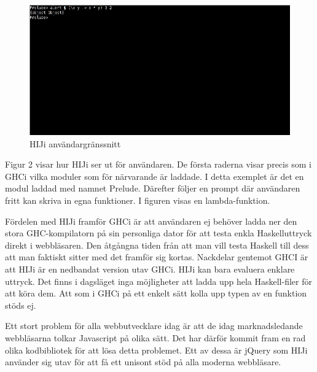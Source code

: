 \begin{figure}[H]
    \begin{center}
        \includegraphics[width=1\textwidth]{hiji_screen3.png}
        \caption{HIJi användargränssnitt}
    \end{center}
\end{figure}

Figur 2 visar hur HIJi ser ut för användaren. De första raderna visar precis som i GHCi vilka moduler som för närvarande är laddade. I detta exemplet är det en modul laddad med namnet Prelude. Därefter följer en prompt där användaren fritt kan skriva in egna funktioner. I figuren visas en lambda-funktion.



Fördelen med HIJi framför GHCi är att användaren ej behöver ladda ner den stora GHC-kompilatorn på sin personliga dator för att testa enkla Haskelluttryck direkt i webbläsaren. Den åtgångna tiden från  att man vill testa Haskell till dess att man faktiskt sitter med det framför sig kortas. 
Nackdelar gentemot GHCI är att HIJi är en nedbandat version utav GHCi. HIJi kan bara evaluera enklare uttryck. Det finns i dagsläget inga möjligheter att ladda upp hela Haskell-filer för att köra dem. Att som i GHCi på ett enkelt sätt kolla upp  typen av en funktion stöds ej.

Ett stort problem för alla webbutvecklare idag är att de idag marknadsledande webbläsarna tolkar Javascript på olika sätt. Det har därför kommit fram en rad olika kodbibliotek för att lösa detta problemet. Ett av dessa är jQuery som HIJi använder sig utav för att få ett unisont stöd på alla moderna webbläsare. 


